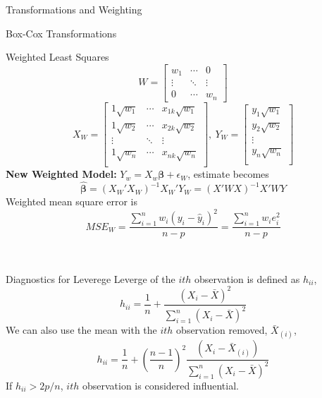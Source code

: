 \documentclass{article}
\begin{document}
\begin{multicols*}{3}
\begin{blackbox}{Transformations and Weighting}
\begin{bluebox}{Box-Cox Transformations}
    \end{bluebox}
    \renewcommand{\arraystretch}{0.75}
    \begin{pinkbox}{Weighted Least Squares}
        \[W = \begin{bmatrix}
            w_1 & \cdots & 0 \\
            \vdots & \ddots  & \vdots\\
            0  & \cdots & w_n
        \end{bmatrix}\]
        \[X_W = \begin{bmatrix}
            1\sqrt{w_1} & \cdots & x_{1k}\sqrt{w_1}\\
            1\sqrt{w_2} & \cdots & x_{2k}\sqrt{w_2}\\
            \vdots  & \ddots & \vdots\\
            1\sqrt{w_n}  & \cdots & x_{nk}\sqrt{w_n}\\
        \end{bmatrix}, \ Y_W = \begin{bmatrix}
            y_1\sqrt{w_1}\\
            y_2\sqrt{w_2}\\
            \vdots\\
            y_n\sqrt{w_n}\\
        \end{bmatrix}\]
        \textbf{New Weighted Model:} $Y_w = X_w\boldsymbol{\beta} + \epsilon_W$, estimate becomes\\[-2ex] 
        \[\boldsymbol{\hat{\beta}} = (X_W'X_W)^{-1}X_W'Y_W = (X'WX)^{-1}X'WY\]
        Weighted mean square error is\\[-2ex]
        \[MSE_W = \frac{\sum_{i=1}^n w_i(y_i - \hat{y}_i)^2}{n-p} = \frac{\sum_{i=1}^nw_ie_i^2}{n-p}\]
    \end{pinkbox}\\[-2ex]
    \end{blackbox}
    \begin{blackbox}{Diagnostics for Leverege}
        Leverge of the $ith$ observation is defined as $h_{ii}$,\\[-1ex] 
        \[h_{ii} = \frac{1}{n} + \frac{(X_i-\bar{X})^2}{\sum_{i=1}^n (X_i-\bar{X})^2}\]
        We can also use the mean with the $ith$ observation removed, $\bar{X}_{(i)}$,\\[-3ex]
        \[h_{ii} = \frac{1}{n} + \left(\frac{n-1}{n}\right)^2\frac{(X_i-\bar{X}_{(i)})}{\sum_{i=1}^n(X_i-\bar{X})^2}\]
        If $h_{ii} > 2p/n$, $ith$ observation is considered influential.
    \end{blackbox}

\end{multicols*}
\end{document}

